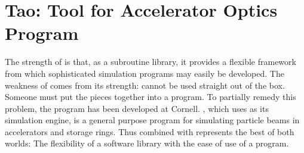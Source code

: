 \section{Tao: Tool for Accelerator Optics Program}
\label{s:tao.intro}

The strength of \bmad is that, as a subroutine library, it provides a flexible framework from which
sophisticated simulation programs may easily be developed.  The weakness of \bmad comes from its
strength: \bmad cannot be used straight out of the box. Someone must put the pieces together into a
program. To partially remedy this problem, the \tao program\cite{b:tao} has been developed at
Cornell. \tao, which uses \bmad as its simulation engine, is a general purpose program for
simulating particle beams in accelerators and storage rings.  Thus \bmad combined with \tao
represents the best of both worlds: The flexibility of a software library with the ease of use of a
program.

